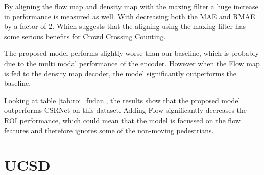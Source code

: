 By aligning the flow map and density map with the maxing filter a huge increase in performance is measured as well. With decreasing both the MAE and RMAE by a factor of 2. Which suggests that the aligning using the maxing filter has some serious benefits for Crowd Crossing Counting.

The proposed model performs slightly worse than our baseline, which is probably due to the multi modal performance of the encoder. However when the Flow map is fed to the density map decoder, the model significantly outperforms the baseline.

Looking at table \ref{tab:roi_fudan}, the results show that the proposed model outperforms CSRNet \cite{li2018csrnet} on this dataset. Adding Flow significantly decreases the ROI performance, which could mean that the model is focussed on the flow features and therefore ignores some of the non-moving pedestrians.

\section{UCSD}

